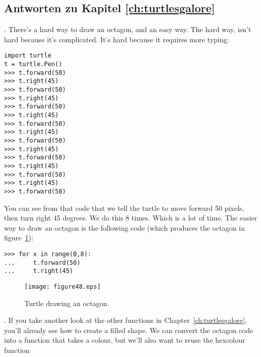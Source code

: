 \subsection*{Antworten zu Kapitel \ref{ch:turtlesgalore}}

. There's a hard way to draw an octagon, and an easy way.  The hard way, isn't hard because it's complicated.  It's hard because it requires more typing:

\begin{listing}
\begin{verbatim}
import turtle
t = turtle.Pen()
>>> t.forward(50)
>>> t.right(45)
>>> t.forward(50)
>>> t.right(45)
>>> t.forward(50)
>>> t.right(45)
>>> t.forward(50)
>>> t.right(45)
>>> t.forward(50)
>>> t.right(45)
>>> t.forward(50)
>>> t.right(45)
>>> t.forward(50)
>>> t.right(45)
>>> t.forward(50)
\end{verbatim}
\end{listing}

\noindent
You can see from that code that we tell the turtle to move forward 50 pixels, then turn right 45 degrees.  We do this 8 times.  Which is a lot of time.  The easier way to draw an octagon is the following code (which produces the octagon in figure~\ref{fig48}):

\begin{listing}
\begin{verbatim}
>>> for x in range(0,8):
...     t.forward(50)
...     t.right(45)
\end{verbatim}
\end{listing}

\begin{figure}
\begin{center}
\texttt{[image: figure48.eps]}
\end{center}
\caption{Turtle drawing an octagon.}\label{fig48}
\end{figure}

.  If you take another look at the other functions in Chapter~\ref{ch:turtlesgalore}, you'll already see how to create a filled shape. We can convert the octagon code into a function that takes a colour, but we'll also want to reuse the hexcolour function 

